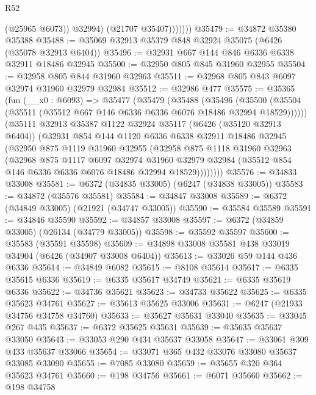 \begin{lexlean}{R52}
\begin{coremodule}
                    (@25965 @6073))
                  @32994)
                (@21707 @35407)))))))
@35479 := @34872 @35380 @35388
@35488 := @35069 @32913 @35379 @848 @32924 @35075 (@6426 (@35078 @32913 @6404))
@35496 := @32931 @667 @144 @846 @6336 @6338 @32911 @18486 @32945
@35500 := @32950 @805 @845 @31960 @32955
@35504 := @32958 @805 @844 @31960 @32963
@35511 := @32968 @805 @843 @6097 @32974 @31960 @32979 @32984
@35512 := @32986 @477
@35575 := @35365
    (fun (__x0 : @6093) =>
    @35477
      (@35479
        (@35488
          (@35496
            (@35500 (@35504 (@35511 (@35512 @667 @146 @6336 @6336 @6076 @18486 @32994 @18529))))))
        (@35111
          @32913
          @35387
          @1122
          @32924
          @35117
          (@6426 (@35120 @32913 @6404))
          (@32931
            @854
            @144
            @1120
            @6336
            @6338
            @32911
            @18486
            @32945
            (@32950
              @875
              @1119
              @31960
              @32955
              (@32958
                @875
                @1118
                @31960
                @32963
                (@32968
                  @875
                  @1117
                  @6097
                  @32974
                  @31960
                  @32979
                  @32984
                  (@35512 @854 @146 @6336 @6336 @6076 @18486 @32994 @18529))))))))
@35576 := @34833 @33008
@35581 := @6372 (@34835 @33005) (@6247 (@34838 @33005))
@35583 := @34872 (@35576 @35581)
@35584 := @34847 @33008
@35589 := @6372 (@34849 @33005) (@21921 (@34747 @33005))
@35590 := @35584 @35589
@35591 := @34846 @35590
@35592 := @34857 @33008
@35597 := @6372 (@34859 @33005) (@26134 (@34779 @33005))
@35598 := @35592 @35597
@35600 := @35583 (@35591 @35598)
@35609 := @34898 @33008 @35581 @438 @33019 @34904 (@6426 (@34907 @33008 @6404))
@35613 := @33026 @59 @144 @436 @6336
@35614 := @34849 @6082
@35615 := @8108 @35614
@35617 := @6335 @35615 @6336
@35619 := @6335 @35617 @34749
@35621 := @6335 @35619 @6336
@35622 := @34736 @35621
@35623 := @34733 @35622
@35625 := @6335 @35623 @34761
@35627 := @35613 @35625 @33006
@35631 := @6247 (@21933 @34756 @34758 @34760)
@35633 := @35627 @35631 @33040
@35635 := @33045 @267 @435
@35637 := @6372 @35625 @35631
@35639 := @35635 @35637 @33050
@35643 := @33053 @290 @434 @35637 @33058
@35647 := @33061 @309 @433 @35637 @33066
@35654 := @33071 @365 @432 @33076 @33080 @35637 @33085 @33090
@35655 := @7085 @33080
@35659 := @35655 @320 @364 @35623 @34761
@35660 := @198 @34756
@35661 := @6071 @35660
@35662 := @198 @34758

\end{coremodule}
\end{lexlean}
